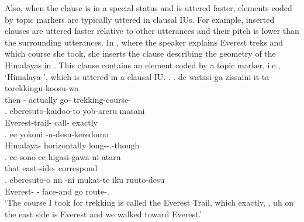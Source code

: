Also,
when the clause is in a special status and is uttered faster,
elements coded by topic markers are typically uttered in clausal IUs.
For example, inserted clauses are uttered faster relative to other utterances and their pitch is lower than the surrounding utterances.
In \Next, where the speaker explains Everest treks and which course she took,
she inserts the clause describing the geometry of the Himalayas in \Next[c].
This clause contains an element coded by a topic marker, i.e.,  `Himalaya-',
which is uttered in a clausal IU.
%
\ex.\label{S01F0151_himaraya}
 \ag. de watasi-ga \tp{\dvline} zissaini \tp{\dvline} it-ta \tp{\dvline} torekkingu-koosu-wa \tp{\dvline} \\
 	then - {} actually {} go- {} trekking-course- {} \\
 \bg. eberesuto-kaidoo-to yob-areru \tp{\dvline} masani \tp{\dvline} \\
 	Everest-trail- call- {} exactly {} \\
 \bg. ee  yokoni -n-desu-keredomo \tp{\dvline} \\
 	 Himalaya- horizontally long--.-though {} \\
 \bg. ee sono \tp{\dvline} ee higasi-gawa-ni ataru \tp{\dvline} \\
 	 that {}  east-side- correspond {} \\
 \bg. eberesuto-o \tp{\dvline} nn -ni  mukat-te iku \tp{\dvline} ruuto-desu \\
 	Everest- {}  - face-and go {} route-. \\
	`The course I took for trekking is called the Everest Trail, which exactly, , uh on the east side is Everest and we walked toward Everest.'

